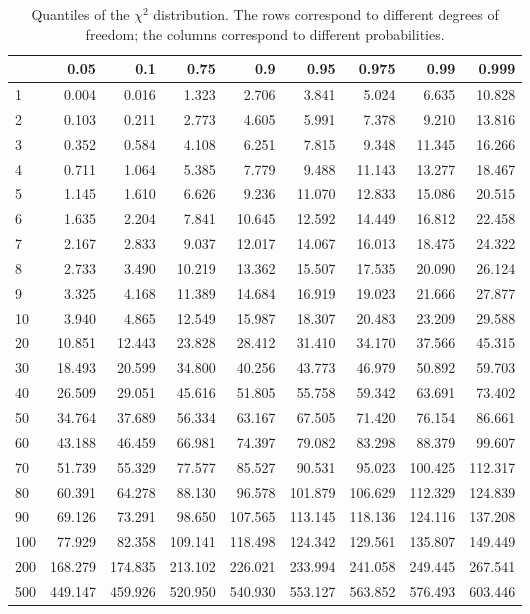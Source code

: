 \documentclass[
  11pt,
]{book}
\theoremstyle{definition}
\theoremstyle{definition}
\theoremstyle{definition}
\theoremstyle{definition}
\theoremstyle{remark}
\begin{document}
\begin{table}

\caption{\label{tab:Chi2}Quantiles of the $\chi^2$ distribution. The rows correspond to different degrees of freedom; the columns correspond to different probabilities.}
\centering
\begin{tabular}[t]{l|r|r|r|r|r|r|r|r}
\hline
  & 0.05 & 0.1 & 0.75 & 0.9 & 0.95 & 0.975 & 0.99 & 0.999\\
\hline
1 & 0.004 & 0.016 & 1.323 & 2.706 & 3.841 & 5.024 & 6.635 & 10.828\\
\hline
2 & 0.103 & 0.211 & 2.773 & 4.605 & 5.991 & 7.378 & 9.210 & 13.816\\
\hline
3 & 0.352 & 0.584 & 4.108 & 6.251 & 7.815 & 9.348 & 11.345 & 16.266\\
\hline
4 & 0.711 & 1.064 & 5.385 & 7.779 & 9.488 & 11.143 & 13.277 & 18.467\\
\hline
5 & 1.145 & 1.610 & 6.626 & 9.236 & 11.070 & 12.833 & 15.086 & 20.515\\
\hline
6 & 1.635 & 2.204 & 7.841 & 10.645 & 12.592 & 14.449 & 16.812 & 22.458\\
\hline
7 & 2.167 & 2.833 & 9.037 & 12.017 & 14.067 & 16.013 & 18.475 & 24.322\\
\hline
8 & 2.733 & 3.490 & 10.219 & 13.362 & 15.507 & 17.535 & 20.090 & 26.124\\
\hline
9 & 3.325 & 4.168 & 11.389 & 14.684 & 16.919 & 19.023 & 21.666 & 27.877\\
\hline
10 & 3.940 & 4.865 & 12.549 & 15.987 & 18.307 & 20.483 & 23.209 & 29.588\\
\hline
20 & 10.851 & 12.443 & 23.828 & 28.412 & 31.410 & 34.170 & 37.566 & 45.315\\
\hline
30 & 18.493 & 20.599 & 34.800 & 40.256 & 43.773 & 46.979 & 50.892 & 59.703\\
\hline
40 & 26.509 & 29.051 & 45.616 & 51.805 & 55.758 & 59.342 & 63.691 & 73.402\\
\hline
50 & 34.764 & 37.689 & 56.334 & 63.167 & 67.505 & 71.420 & 76.154 & 86.661\\
\hline
60 & 43.188 & 46.459 & 66.981 & 74.397 & 79.082 & 83.298 & 88.379 & 99.607\\
\hline
70 & 51.739 & 55.329 & 77.577 & 85.527 & 90.531 & 95.023 & 100.425 & 112.317\\
\hline
80 & 60.391 & 64.278 & 88.130 & 96.578 & 101.879 & 106.629 & 112.329 & 124.839\\
\hline
90 & 69.126 & 73.291 & 98.650 & 107.565 & 113.145 & 118.136 & 124.116 & 137.208\\
\hline
100 & 77.929 & 82.358 & 109.141 & 118.498 & 124.342 & 129.561 & 135.807 & 149.449\\
\hline
200 & 168.279 & 174.835 & 213.102 & 226.021 & 233.994 & 241.058 & 249.445 & 267.541\\
\hline
500 & 449.147 & 459.926 & 520.950 & 540.930 & 553.127 & 563.852 & 576.493 & 603.446\\
\hline
\end{tabular}
\end{table}
\end{document}
